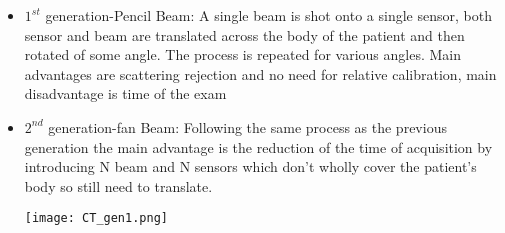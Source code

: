 \begin{itemize}
\item $1^{st}$ generation-Pencil Beam: A single beam is shot onto a single sensor, both sensor and beam are translated across the body of the patient and then rotated of some angle. The process is repeated for various angles. Main advantages are scattering rejection and no need for relative calibration, main disadvantage is time of the exam
\item $2^{nd}$ generation-fan Beam: Following the same process as the previous generation the main advantage is the reduction of the time of acquisition by introducing N beam and N sensors which don't wholly cover the patient's body so still need to translate.

\begin{minipage}{\linewidth}
            \centering
            \texttt{[image: CT\_gen1.png]}
        \end{minipage}


\end{itemize}
